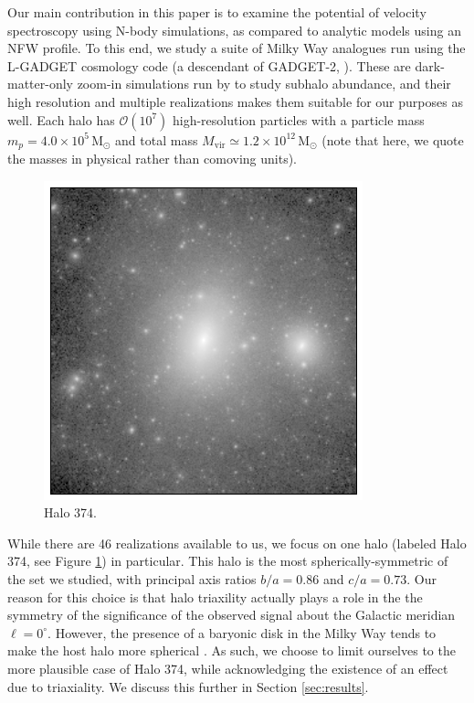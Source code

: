 \documentclass[aps,prl,10pt,twocolumn,superscriptaddress,showpacs]{revtex4-1}
\newcommand{\units}[1]{\,\mathrm{#1}}
\begin{document}
Our main contribution in this paper is to examine the potential of velocity spectroscopy using
N-body simulations, as compared to analytic models using an NFW profile.
To this end, we study a suite of Milky Way analogues run using the L-GADGET cosmology code
(a descendant of GADGET-2, \cite{springel2005}). These are dark-matter-only zoom-in simulations 
run by \cite{mao2015} to study subhalo abundance, and their high resolution and multiple
realizations makes them suitable for our purposes as well. Each halo has $\mathcal{O}(10^7)$
high-resolution particles with a particle mass $m_p=4.0\times10^5\units{M_{\odot}}$ and total 
mass $M_{\mathrm{vir}}\simeq1.2\times10^{12}\units{M_{\odot}}$ (note that here, we quote the masses in physical rather than comoving
units).

\begin{figure}[h!]
\centering
\includegraphics[width=0.9\columnwidth]{halo374.png}
\caption{Halo 374.}
\label{fig:halo374}
\end{figure}

While there are 46 realizations available to us, we focus on one halo (labeled Halo 374, see Figure
\ref{fig:halo374}) in particular. 
This halo is the most spherically-symmetric of the set we studied, with principal axis ratios
$b/a=0.86$ and $c/a=0.73$. Our reason for this choice is that halo triaxility actually plays a role
in the the symmetry of the significance of the observed signal about the Galactic meridian $\ell=0^{\circ}$.
However, the presence of a baryonic disk in the Milky Way tends to make the host
halo more spherical \cite{debattista2008, bryan2013}. As such, we choose to limit ourselves to the more plausible case of
Halo 374, while acknowledging the existence of an effect due to triaxiality. 
We discuss this further in Section \ref{sec:results}.
\end{document}
